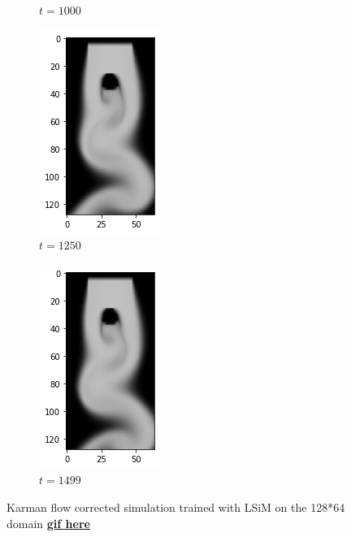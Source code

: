 \documentclass[a4paper,12pt,twoside]{report}
\begin{document}
\begin{figure}
\begin{subfigure}{0.18\textwidth}
		\caption{$t=1000$}
	\end{subfigure}
	\begin{subfigure}{0.18\textwidth}
		\centering
		\includegraphics[scale=0.5]{karmanflow/lsim_density_001250.png}
		\caption{$t=1250$}
	\end{subfigure}
	\begin{subfigure}{0.18\textwidth}
		\centering
		\includegraphics[scale=0.5]{karmanflow/lsim_density_001499.png}
		\caption{$t=1499$}
	\end{subfigure}
	\caption{Karman flow corrected simulation trained with LSiM on the 128*64 domain \href{https://github.com/w191444052/sol-data/blob/master/karman_high/lsim.gif}{\bf{gif here}}}
	\label{sol karman high lsim}
\end{figure}
\end{document}
